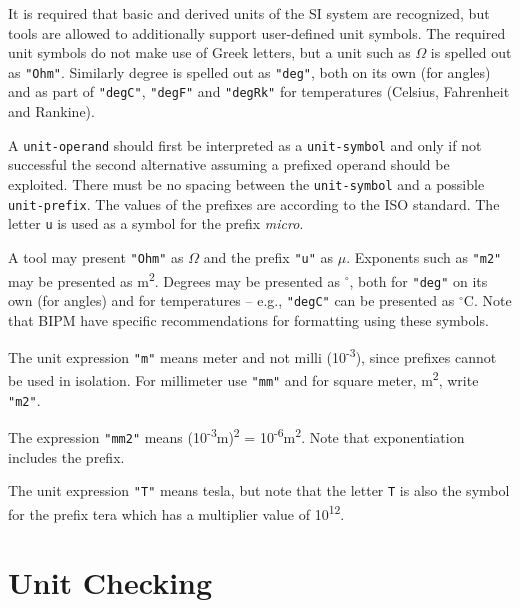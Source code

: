 It is required that basic and derived units of the SI system are recognized, but tools are allowed to additionally support user-defined unit symbols.
The required unit symbols do not make use of Greek letters, but a unit such as $\Omega$ is spelled out as \lstinline!"Ohm"!.
Similarly degree is spelled out as \lstinline!"deg"!, both on its own (for angles) and as part of \lstinline!"degC"!, \lstinline!"degF"! and \lstinline!"degRk"! for temperatures (Celsius, Fahrenheit and Rankine).

A \lstinline[language=grammar]!unit-operand! should first be interpreted as a \lstinline[language=grammar]!unit-symbol! and only if not successful the second alternative assuming a prefixed operand should be exploited.
There must be no spacing between the \lstinline[language=grammar]!unit-symbol! and a possible \lstinline[language=grammar]!unit-prefix!.
The values of the prefixes are according to the ISO standard.
The letter \lstinline!u! is used as a symbol for the prefix \emph{micro}.

\begin{nonnormative}
A tool may present \lstinline!"Ohm"! as $\Omega$ and the prefix \lstinline!"u"! as $\mu$.
Exponents such as \lstinline!"m2"! may be presented as m\textsuperscript{2}.
Degrees may be presented as $^{\circ}$, both for \lstinline!"deg"! on its own (for angles) and for temperatures -- e.g., \lstinline!"degC"! can be presented as $^{\circ}$C.
Note that BIPM have specific recommendations for formatting using these symbols.
\end{nonnormative}

\begin{example}
The unit expression \lstinline!"m"! means meter and not milli (10\textsuperscript{-3}), since prefixes cannot be used in isolation.
For millimeter use \lstinline!"mm"! and for square meter, m\textsuperscript{2}, write \lstinline!"m2"!.

The expression \lstinline!"mm2"! means (10\textsuperscript{-3}m)\textsuperscript{2} = 10\textsuperscript{-6}m\textsuperscript{2}.
Note that exponentiation includes the prefix.

The unit expression \lstinline!"T"! means tesla, but note that the letter \lstinline!T! is also the symbol for the prefix tera which has a multiplier value of 10\textsuperscript{12}.
\end{example}


\section{Unit Checking}\label{unit-checking}


